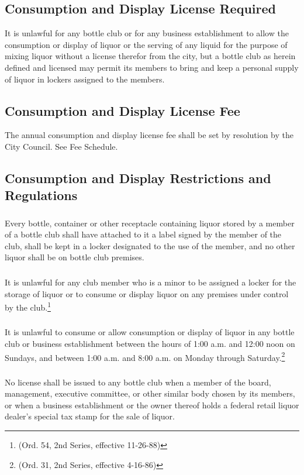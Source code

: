 \subsection{Consumption and Display License Required}
It is unlawful for any bottle club or for any business establishment to allow the consumption or display of liquor or the serving of any liquid for the purpose of mixing liquor without a license therefor from the city, but a bottle club as herein defined and licensed may permit its members to bring and keep a personal supply of liquor in lockers assigned to the members.
\subsection{Consumption and Display License Fee}
The annual consumption and display license fee shall be set by resolution by the City Council. See Fee Schedule.
\subsection{Consumption and Display Restrictions and Regulations}
\subsubsection{}
Every bottle, container or other receptacle containing liquor stored by a member of a bottle club shall have attached to it a label signed by the member of the club, shall be kept in a locker designated to the use of the member, and no other liquor shall be on bottle club premises.
\subsubsection{}
It is unlawful for any club member who is a minor to be assigned a locker for the storage of liquor or to consume or display liquor on any premises under control by the club.\footnote{(Ord. 54, 2nd Series, effective 11-26-88)}
\subsubsection{}
It is unlawful to consume or allow consumption or display of liquor in any bottle club or business establishment between the hours of 1:00 a.m. and 12:00 noon on Sundays, and between 1:00 a.m. and 8:00 a.m. on Monday through Saturday.\footnote{(Ord. 31, 2nd Series, effective 4-16-86)}
\subsubsection{}
No license shall be issued to any bottle club when a member of the board, management, executive committee, or other similar body chosen by its members, or when a business establishment or the owner thereof holds a federal retail liquor dealer’s special tax stamp for the sale of liquor.
